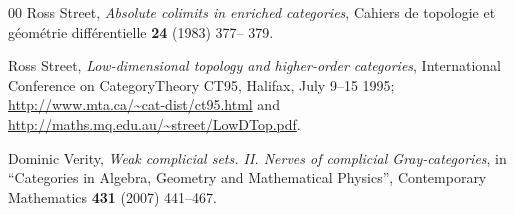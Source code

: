 \documentclass[a4paper,12pt,reqno]{amsart}
\theoremstyle{definition}
\theoremstyle{fact}
\theoremstyle{genquest}
\theoremstyle{step}
\begin{document}
\begin{thebibliography}{00}
 Ross Street, \textit{Absolute colimits in enriched categories}, Cahiers de topologie et g\'eom\'etrie diff\'erentielle \textbf{24} (1983) 377-- 379.\label{ACEC}

 Ross Street, \textit{Low-dimensional topology and higher-order categories}, International Conference on CategoryTheory CT95, Halifax, July 9--15 1995; \url{http://www.mta.ca/~cat-dist/ct95.html} and \url{http://maths.mq.edu.au/~street/LowDTop.pdf}.\label{LDTHOC}

 Dominic Verity, \textit{Weak complicial sets. II. Nerves of complicial Gray-categories}, 
in ``Categories in Algebra, Geometry and Mathematical Physics'', 
Contemporary Mathematics \textbf{431} (2007) 441--467.\label{Verity07}

\end{thebibliography}
\end{document}
